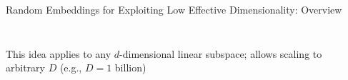\begin{frame}[c]{Random Embeddings for Exploiting Low Effective Dimensionality: Overview}
\begin{itemize}
\begin{columns}[T]
\begin{column}{0.5\linewidth}
\begin{figure}
    \end{figure}
    \end{column}
\end{columns}
    \pause
\begin{columns}
\begin{column}{0.45\linewidth}
    \vspace{-8em}
    \item This idea applies to any $d$-dimensional linear subspace; allows scaling to arbitrary $D$ (e.g., $D=1$ billion)
\end{column}
\begin{column}{0.5\linewidth}

\end{column}
\end{columns}
\end{itemize}


\end{frame}


